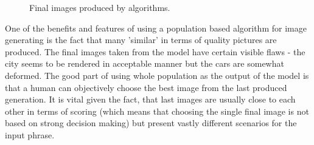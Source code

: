 \documentclass[11pt,a4paper,openany]{book}
\begin{document}
\begin{figure}[h]
    \centering
    \qquad
    \caption{Final images produced by algorithms.}%
    \label{fig:example}%
\end{figure}
\noindent One of the benefits and features of using a population based algorithm for image generating is the fact that many 'similar' in terms of quality pictures are produced. The final images taken from the model have certain visible flaws - the city seems to be rendered in acceptable manner but the cars are somewhat deformed. The good part of using whole population as the output of the model is that a human can objectively choose the best image from the last produced generation. It is vital given the fact, that last images are usually close to each other in terms of scoring (which means that choosing the single final image is not based on strong decision making) but present vastly different scenarios for the input phrase.\\
\end{document}
